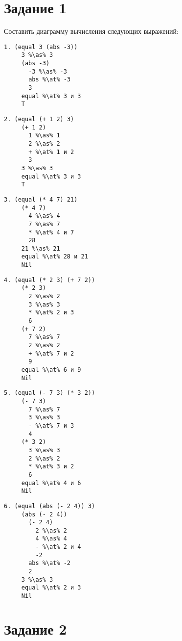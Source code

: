 \section*{Задание 1}

Составить диаграмму вычисления следующих выражений:

\begin{lstlisting}[style={scheme}]
1. (equal 3 (abs -3))
     3 %\as% 3
     (abs -3)
       -3 %\as% -3
       abs %\at% -3
       3
     equal %\at% 3 и 3
     T
\end{lstlisting}

\begin{lstlisting}[style={scheme}]
2. (equal (+ 1 2) 3)
     (+ 1 2)
       1 %\as% 1
       2 %\as% 2
       + %\at% 1 и 2
       3
     3 %\as% 3
     equal %\at% 3 и 3
     T
\end{lstlisting}

\clearpage
\begin{lstlisting}[style={scheme}]
3. (equal (* 4 7) 21)
     (* 4 7)
       4 %\as% 4
       7 %\as% 7
       * %\at% 4 и 7
       28
     21 %\as% 21
     equal %\at% 28 и 21
     Nil
\end{lstlisting}

\begin{lstlisting}[style={scheme}]
4. (equal (* 2 3) (+ 7 2))
     (* 2 3)
       2 %\as% 2
       3 %\as% 3
       * %\at% 2 и 3
       6
     (+ 7 2)
       7 %\as% 7
       2 %\as% 2
       + %\at% 7 и 2
       9
     equal %\at% 6 и 9
     Nil
\end{lstlisting}

\clearpage
\begin{lstlisting}[style={scheme}]
5. (equal (- 7 3) (* 3 2))
     (- 7 3)
       7 %\as% 7
       3 %\as% 3
       - %\at% 7 и 3
       4
     (* 3 2)
       3 %\as% 3
       2 %\as% 2
       * %\at% 3 и 2
       6
     equal %\at% 4 и 6
     Nil
\end{lstlisting}

\begin{lstlisting}[style={scheme}]
6. (equal (abs (- 2 4)) 3)
     (abs (- 2 4))
       (- 2 4)
         2 %\as% 2
         4 %\as% 4
         - %\at% 2 и 4
         -2
       abs %\at% -2
       2
     3 %\as% 3
     equal %\at% 2 и 3
     Nil
\end{lstlisting}

\clearpage
\section*{Задание 2}


